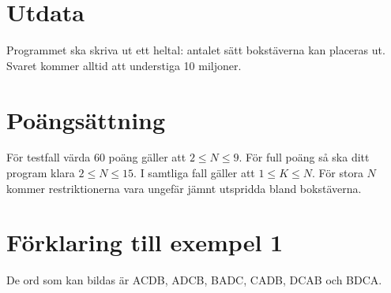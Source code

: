 \section*{Utdata}

Programmet ska skriva ut ett heltal: antalet sätt bokstäverna kan
placeras ut. Svaret kommer alltid att understiga 10 miljoner.

\section*{Poängsättning}

För testfall värda $60$ poäng gäller att $2\le N\le 9$. För full
poäng så ska ditt program klara $2\le N\le 15$. I samtliga fall gäller att $1\le K\le N$.
För stora $N$ kommer restriktionerna vara ungefär jämnt utspridda bland
bokstäverna.

\section*{Förklaring till exempel 1}

De ord som kan bildas är ACDB, ADCB, BADC, CADB,
DCAB och BDCA.
